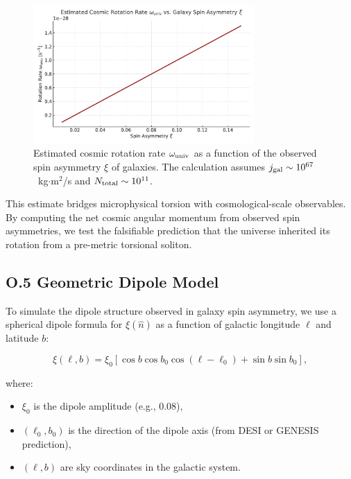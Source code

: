 \documentclass{article}
\begin{document}
\begin{figure}[h!]
\centering
\includegraphics[width=0.75\textwidth]{Omega_vs_xi_GENESIS.pdf}
\caption{Estimated cosmic rotation rate $\omega_{\rm univ}$ as a function of the observed spin asymmetry $\xi$ of galaxies. The calculation assumes $j_{\rm gal} \sim 10^{67}$~kg$\cdot$m$^2$/s and $N_{\rm total} \sim 10^{11}$.}
\label{fig:omega_vs_xi}
\end{figure}


\begin{tcolorbox}[colback=gray!5, colframe=black!30, title=Why this matters]
This estimate bridges microphysical torsion with cosmological-scale observables. By computing the net cosmic angular momentum from observed spin asymmetries, we test the falsifiable prediction that the universe inherited its rotation from a pre-metric torsional soliton.
\end{tcolorbox}


\subsection*{O.5 Geometric Dipole Model}

To simulate the dipole structure observed in galaxy spin asymmetry, we use a spherical dipole formula for $\xi(\hat{n})$ as a function of galactic longitude $\ell$ and latitude $b$:

\begin{equation}
\xi(\ell, b) = \xi_0 \left[ \cos b \cos b_0 \cos(\ell - \ell_0) + \sin b \sin b_0 \right],
\end{equation}

where:
\begin{itemize}
  \item $\xi_0$ is the dipole amplitude (e.g., 0.08),
  \item $(\ell_0, b_0)$ is the direction of the dipole axis (from DESI or GENESIS prediction),
  \item $(\ell, b)$ are sky coordinates in the galactic system.
\end{itemize}
\end{document}
